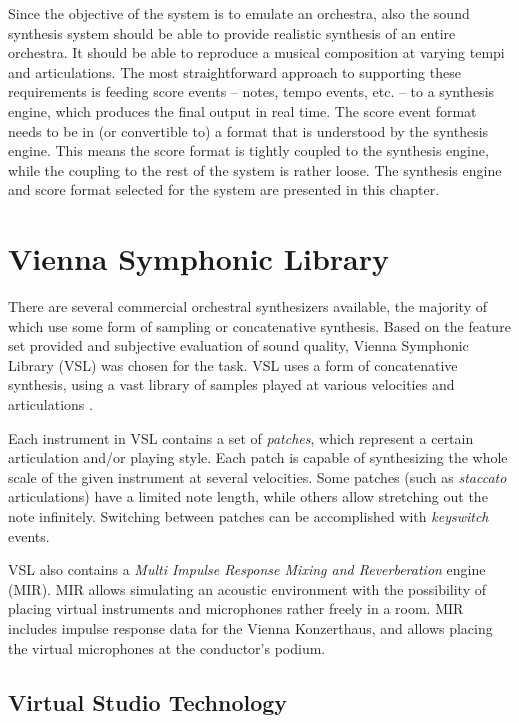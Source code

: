 Since the objective of the system is to emulate an orchestra,
also the sound synthesis system should be able to
provide realistic synthesis of an entire orchestra.
It should be able to reproduce a musical composition
at varying tempi and articulations.
The most straightforward approach to supporting these requirements
is feeding score events --
notes, tempo events, etc. --
to a synthesis engine,
which produces the final output in real time.
The score event format needs to be in
(or convertible to)
a format that is understood by the synthesis engine.
This means the score format is tightly
coupled to the synthesis engine,
while the coupling to the rest of the system is rather loose.
The synthesis engine and score format selected for the system
are presented in this chapter.

\section{Vienna Symphonic Library}

There are several commercial orchestral synthesizers available,
the majority of which use some form of sampling or concatenative synthesis.
Based on the feature set provided and
subjective evaluation of sound quality,
Vienna Symphonic Library (VSL) \cite{vsl} was chosen for the task.
VSL uses a form of concatenative synthesis,
using a vast library of samples played at
various velocities and articulations \cite{schwartz2006}.

Each instrument in VSL contains a set of \textit{patches},
which represent a certain articulation and/or playing style.
Each patch is capable of synthesizing
the whole scale of the given instrument at several velocities.
Some patches (such as \textit{staccato} articulations)
have a limited note length,
while others allow stretching out the note infinitely.
Switching between patches can be accomplished with \textit{keyswitch} events.

VSL also contains a \textit{Multi Impulse Response Mixing and Reverberation}
engine (MIR).
MIR allows simulating an acoustic environment with
the possibility of placing virtual instruments and microphones
rather freely in a room.
MIR includes impulse response data for the Vienna Konzerthaus,
and allows placing the virtual microphones at the conductor's podium.

\subsection{Virtual Studio Technology}
\label{sec:vst}

